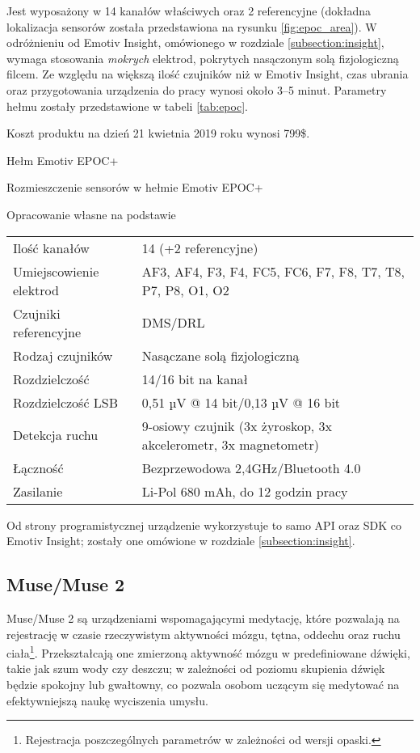 \documentclass[skorowidz,skroty]{dyplomWEZUT}
\begin{document}
Jest wyposażony w 14 kanałów właściwych oraz 2 referencyjne (dokładna lokalizacja sensorów została przedstawiona na rysunku \vref{fig:epoc_area}). W odróżnieniu od Emotiv Insight, omówionego w rozdziale \vref{subsection:insight}, wymaga stosowania \textit{mokrych} elektrod, pokrytych nasączonym solą fizjologiczną filcem. Ze względu na większą ilość czujników niż w Emotiv Insight, czas ubrania oraz przygotowania urządzenia do pracy wynosi około 3--5 minut. Parametry hełmu zostały przedstawione w tabeli \vref{tab:epoc}.

Koszt produktu na dzień 21 kwietnia 2019 roku wynosi 799\$.

{Hełm Emotiv EPOC+\label{fig:epoc}}
{\cite{emotiv_epoc}}

{Rozmieszczenie sensorów w hełmie Emotiv EPOC+\label{fig:epoc_area}}
{\cite{emotiv_epoc}}

{Opracowanie własne na podstawie \cite{emotiv_comparison}}
{
    \begin{tabular}{l|l}
        Ilość kanałów & 14 (+2 referencyjne)\\
        Umiejscowienie elektrod & AF3, AF4, F3, F4, FC5, FC6, F7, F8, T7, T8, P7, P8, O1, O2\\
        Czujniki referencyjne & DMS/DRL\\
        Rodzaj czujników & Nasączane solą fizjologiczną\\
        Rozdzielczość & 14/16 bit na kanał\\
        Rozdzielczość LSB & 0,51 µV @ 14 bit/0,13 µV @ 16 bit\\
        Detekcja ruchu & 9-osiowy czujnik (3x żyroskop, 3x akcelerometr, 3x magnetometr)\\
        Łączność & Bezprzewodowa 2,4GHz/Bluetooth 4.0\\
        Zasilanie & Li-Pol 680 mAh, do 12 godzin pracy
    \end{tabular}
}

Od strony programistycznej urządzenie wykorzystuje to samo API oraz SDK co Emotiv Insight; zostały one omówione w rozdziale \vref{subsection:insight}.

\FloatBarrier
\subsection{Muse/Muse 2}
Muse/Muse 2 są urządzeniami wspomagającymi medytację, które pozwalają na rejestrację w czasie rzeczywistym aktywności mózgu, tętna, oddechu oraz ruchu ciała\footnote{Rejestracja poszczególnych parametrów w zależności od wersji opaski.}\cite{muse2}. Przekształcają one zmierzoną aktywność mózgu w predefiniowane dźwięki, takie jak szum wody czy deszczu; w zależności od poziomu skupienia dźwięk będzie spokojny lub gwałtowny, co pozwala osobom uczącym się medytować na efektywniejszą naukę wyciszenia umysłu.
\end{document}
